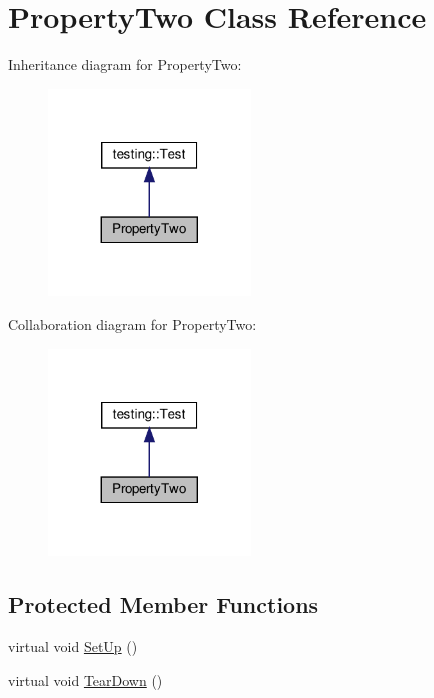 \hypertarget{class_property_two}{}\section{Property\+Two Class Reference}
\label{class_property_two}


Inheritance diagram for Property\+Two\+:
\nopagebreak
\begin{figure}[H]
\begin{center}
\leavevmode
\includegraphics[width=152pt]{class_property_two__inherit__graph}
\end{center}
\end{figure}


Collaboration diagram for Property\+Two\+:
\nopagebreak
\begin{figure}[H]
\begin{center}
\leavevmode
\includegraphics[width=152pt]{class_property_two__coll__graph}
\end{center}
\end{figure}
\subsection*{Protected Member Functions}
\begin{DoxyCompactItemize}
\item 
virtual void \hyperlink{class_property_two_aa3ab39cf4e6c751cb0788c575bf92ca2}{Set\+Up} ()
\item 
virtual void \hyperlink{class_property_two_aa4ffb2b9dddeba69f0f9baf133f06ef2}{Tear\+Down} ()
\end{DoxyCompactItemize}
